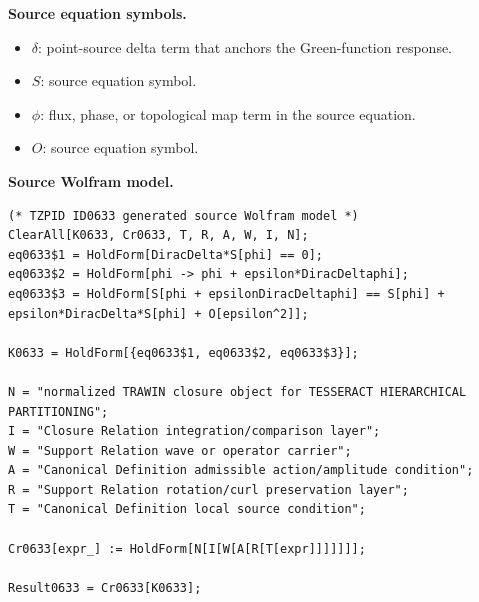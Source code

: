 \begin{minipage}[t]{0.49\linewidth}
\begingroup
\small
\raggedright
\textbf{Source equation symbols.}\par
\begin{itemize}[leftmargin=1.35em,itemsep=1pt,topsep=1pt,parsep=0pt]
    \item $\delta$: point-source delta term that anchors the Green-function response.
    \item $S$: source equation symbol.
    \item $\phi$: flux, phase, or topological map term in the source equation.
    \item $O$: source equation symbol.
\end{itemize}
\endgroup
\end{minipage}\hfill
\begin{minipage}[t]{0.47\linewidth}
\begingroup
\scriptsize
\raggedright
\textbf{Source Wolfram model.}\par
\begin{Verbatim}[fontsize=\tiny,breaklines=true,breakanywhere=true]
(* TZPID ID0633 generated source Wolfram model *)
ClearAll[K0633, Cr0633, T, R, A, W, I, N];
eq0633$1 = HoldForm[DiracDelta*S[phi] == 0];
eq0633$2 = HoldForm[phi -> phi + epsilon*DiracDeltaphi];
eq0633$3 = HoldForm[S[phi + epsilonDiracDeltaphi] == S[phi] + epsilon*DiracDelta*S[phi] + O[epsilon^2]];

K0633 = HoldForm[{eq0633$1, eq0633$2, eq0633$3}];

N = "normalized TRAWIN closure object for TESSERACT HIERARCHICAL PARTITIONING";
I = "Closure Relation integration/comparison layer";
W = "Support Relation wave or operator carrier";
A = "Canonical Definition admissible action/amplitude condition";
R = "Support Relation rotation/curl preservation layer";
T = "Canonical Definition local source condition";

Cr0633[expr_] := HoldForm[N[I[W[A[R[T[expr]]]]]]];

Result0633 = Cr0633[K0633];
\end{Verbatim}
\endgroup
\end{minipage}

